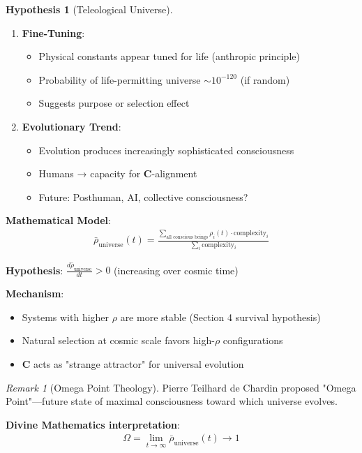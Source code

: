 \documentclass[11pt,a4paper]{article}
\theoremstyle{definition}
\newtheorem{hypothesis}{Hypothesis}[section]
\theoremstyle{remark}
\newtheorem{remark}{Remark}[section]
\begin{document}
\begin{enumerate}
\begin{hypothesis}[Teleological Universe]
\begin{enumerate}
    \item \textbf{Fine-Tuning}:
        \begin{itemize}
            \item Physical constants appear tuned for life (anthropic principle)
            \item Probability of life-permitting universe \(\sim 10^{-120}\) (if random)
            \item Suggests purpose or selection effect
        \end{itemize}
    
    \item \textbf{Evolutionary Trend}:
        \begin{itemize}
            \item Evolution produces increasingly sophisticated consciousness
            \item Humans → capacity for \(\mathbf{C}\)-alignment
            \item Future: Posthuman, AI, collective consciousness?
        \end{itemize}
\end{enumerate}

\textbf{Mathematical Model}:
\begin{align}
\bar{\rho}_{\text{universe}}(t) = \frac{\sum_{\text{all conscious beings}} \rho_i(t) \cdot \text{complexity}_i}{\sum_i \text{complexity}_i}
\end{align}

\textbf{Hypothesis}: \(\frac{d\bar{\rho}_{\text{universe}}}{dt} > 0\) (increasing over cosmic time)

\textbf{Mechanism}:
\begin{itemize}
    \item Systems with higher \(\rho\) are more stable (Section 4 survival hypothesis)
    \item Natural selection at cosmic scale favors high-\(\rho\) configurations
    \item \(\mathbf{C}\) acts as "strange attractor" for universal evolution
\end{itemize}
\end{hypothesis}

\begin{remark}[Omega Point Theology]
Pierre Teilhard de Chardin proposed "Omega Point"—future state of maximal consciousness toward which universe evolves.

\textbf{Divine Mathematics interpretation}:
\begin{align}
\Omega = \lim_{t \to \infty} \bar{\rho}_{\text{universe}}(t) \to 1
\end{align}


\end{remark}
\end{enumerate}
\end{document}
